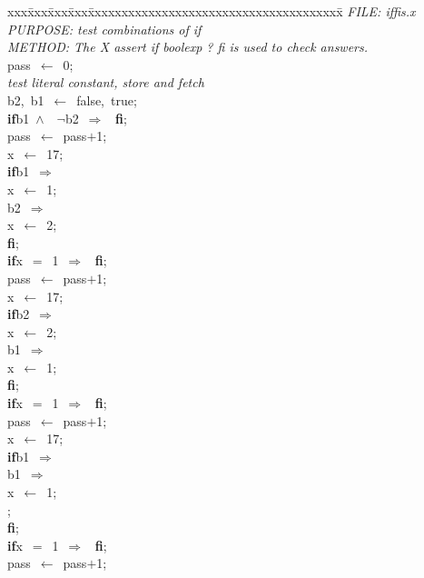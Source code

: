 \documentclass{report}
\begin{document}
\pagestyle{empty}
\begin{tabbing}
xxx\=xxx\=xxx\=xxx\=xxxxxxxxxxxxxxxxxxxxxxxxxxxxxxxxxxxxxx\=\kill
{\tt{}}{\em{} FILE:    iffis.x
}\\
{\tt{}}{\em{} PURPOSE: test combinations of if
}\\
{\tt{}}{\em{} METHOD:  The X assert  if boolexp ? fi is used to check answers.
}\\
pass\ $\leftarrow$\ 0;\>\>\>\>\\
{\tt{}}{\em{} test literal constant, store and fetch
}\\
b2,\ b1\ $\leftarrow$\ false,\ true;\\
{\bf if}\>b1\ $\wedge$\ \ $\neg$b2\ $\Rightarrow$
\ {\bf {f}{i}};
\\
pass\ $\leftarrow$\ pass$+$1;\\
x\ $\leftarrow$\ 17;\\
{\bf if}\>b1\ $\Rightarrow$
\\
\>x\ $\leftarrow$\ 1;\\
\raisebox{2pt}{\ \ \framebox[2pt]{\rule{0pt}{1pt}}}
\>b2\ $\Rightarrow$
\\
\>x\ $\leftarrow$\ 2;\\
{\bf {f}{i}};
\\
{\bf if}\>x\ $=$\ 1\ $\Rightarrow$
\ {\bf {f}{i}};
\\
pass\ $\leftarrow$\ pass$+$1;\\
x\ $\leftarrow$\ 17;\\
{\bf if}\>b2\ $\Rightarrow$
\\
\>x\ $\leftarrow$\ 2;\\
\raisebox{2pt}{\ \ \framebox[2pt]{\rule{0pt}{1pt}}}
\>b1\ $\Rightarrow$
\\
\>x\ $\leftarrow$\ 1;\\
{\bf {f}{i}};
\\
{\bf if}\>x\ $=$\ 1\ $\Rightarrow$
\ {\bf {f}{i}};
\\
pass\ $\leftarrow$\ pass$+$1;\\
x\ $\leftarrow$\ 17;\\
{\bf if}\>b1\ $\Rightarrow$
\\
\>b1\ $\Rightarrow$
\\
\>\>x\ $\leftarrow$\ 1;\\
;
\\
{\bf {f}{i}};
\\
{\bf if}\>x\ $=$\ 1\ $\Rightarrow$
\ {\bf {f}{i}};
\\
pass\ $\leftarrow$\ pass$+$1;\\

\end{tabbing}
\end{document}
